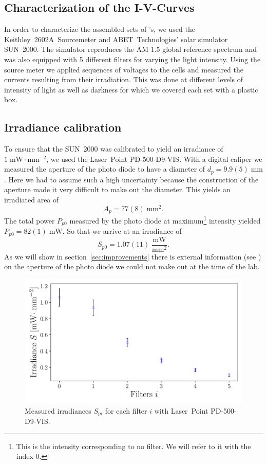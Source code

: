 \documentclass[a4paper,10pt,twocolumn]{article}
\begin{document}
\begin{extract*}

\section{Characterization of the I-V-Curves}\label{sec:charac}

In order to characterize the assembled sets of \BHSC's, we used the Keithley~2602A~Sourcemeter and ABET~Technologies’ solar simulator SUN~2000. The simulator reproduces the AM 1.5 global reference spectrum and was also equipped with 5 different filters for varying the light intensity. Using the source meter we applied sequences of voltages to the cells and measured the currents resulting from their irradiation. This was done at different levels of intensity of light as well as darkness for which we covered each set with a plastic box.
\subsection{Irradiance calibration}
To ensure that the SUN~2000 was calibrated to yield an irradiance of $1\;\text{mW}\!\cdot\text{mm}^{-2}$, we used the Laser~Point PD-500-D9-VIS. With a digital caliper we measured the aperture of the photo diode to have a diameter of $d_p = 9.9(5)\;\text{mm}$. Here we had to assume such a high uncertainty because the construction of the aperture made it very difficult to make out the diameter. This yields an irradiated area of
\begin{equation*}
	A_p =  77(8)\;\text{mm}^2.
\end{equation*}
The total power $P_{p0}$ measured by the photo diode at maximum\footnote{This is the intensity corresponding to no filter. We will refer to it with the index 0.} intensity yielded $P_{p0} = 82(1)\;\text{mW}$. So that we arrive at an irradiance of
\begin{equation*}
	S_{p0} = 1.07(11)\;\frac{\text{mW}}{\text{mm}^2}.
\end{equation*}
As we will show in section~\ref{sec:improvements} there is external information (see \cite{photodiode}) on the aperture of the photo diode we could not make out at the time of the lab.
\begin{figure}[h]
	\includegraphics[scale=0.5]{../2_Pictures/Photodiode_irradiance.pdf}
	\caption{Measured irradiances $S_{pi}$ for each filter $i$ with Laser~Point PD-500-D9-VIS.}
	\label{fig:photodiode_irradiances}
\end{figure}


\end{extract*}
\end{document}
